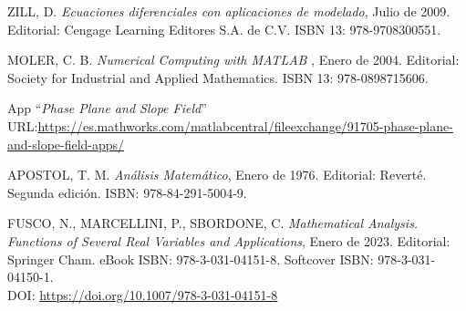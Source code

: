 \documentclass[12pt,a4paper]{report} %
\begin{document}
\begin{thebibliography}{99}
		 ZILL, D. \textit{Ecuaciones diferenciales con aplicaciones de modelado}, Julio de 2009. Editorial: Cengage Learning Editores S.A. de C.V. ISBN 13: 978-9708300551.
		
		\newpage
		
		 MOLER, C. B. \textit{Numerical Computing with MATLAB }, Enero de 2004. Editorial: Society for Industrial and Applied Mathematics. ISBN 13: 978-0898715606.
		
		 App ``\textit{Phase Plane and Slope Field}''
		\\URL:\hspace{1mm}\href{https://es.mathworks.com/matlabcentral/fileexchange/91705-phase-plane-and-slope-field-apps/}{https://es.mathworks.com/matlabcentral/fileexchange/91705-phase-plane-and-slope-field-apps/}
		
		 APOSTOL, T. M. \textit{Análisis Matemático}, Enero de 1976. Editorial: Reverté. Segunda edición. ISBN: 978-84-291-5004-9.
		
		 FUSCO, N., MARCELLINI, P., SBORDONE, C. \textit{Mathematical Analysis. Functions of Several Real Variables and Applications}, Enero de 2023. Editorial: Springer Cham. eBook ISBN: 978-3-031-04151-8. Softcover ISBN: 978-3-031-04150-1. \\DOI: \href{https://doi.org/10.1007/978-3-031-04151-8}{https://doi.org/10.1007/978-3-031-04151-8}
		
	\end{thebibliography}
	
\end{document}
